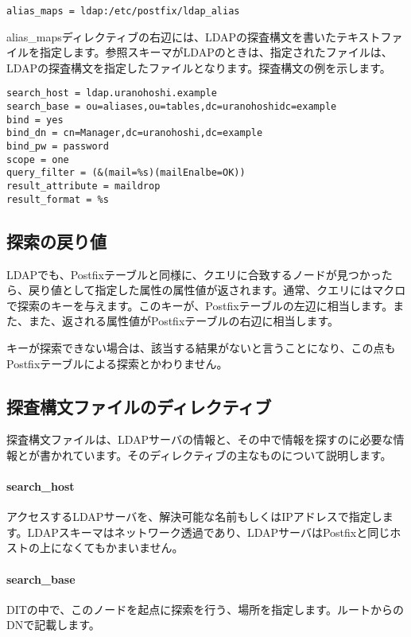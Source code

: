 \begin{verbatim}
alias_maps = ldap:/etc/postfix/ldap_alias
\end{verbatim}

alias\_mapsディレクティブの右辺には、LDAPの探査構文を書いたテキストファイルを指定します。参照スキーマがLDAPのときは、指定されたファイルは、LDAPの探査構文を指定したファイルとなります。探査構文の例を示します。

\begin{verbatim}
search_host = ldap.uranohoshi.example
search_base = ou=aliases,ou=tables,dc=uranohoshidc=example
bind = yes
bind_dn = cn=Manager,dc=uranohoshi,dc=example
bind_pw = password
scope = one
query_filter = (&(mail=%s)(mailEnalbe=OK))
result_attribute = maildrop
result_format = %s
\end{verbatim}

\subsection{探索の戻り値}

LDAPでも、Postfixテーブルと同様に、クエリに合致するノードが見つかったら、戻り値として指定した属性の属性値が返されます。通常、クエリにはマクロで探索のキーを与えます。このキーが、Postfixテーブルの左辺に相当します。また、また、返される属性値がPostfixテーブルの右辺に相当します。

キーが探索できない場合は、該当する結果がないと言うことになり、この点もPostfixテーブルによる探索とかわりません。


\subsection{探査構文ファイルのディレクティブ}

探査構文ファイルは、LDAPサーバの情報と、その中で情報を探すのに必要な情報とが書かれています。そのディレクティブの主なものについて説明します。

\paragraph{search\_host}
アクセスするLDAPサーバを、解決可能な名前もしくはIPアドレスで指定します。LDAPスキーマはネットワーク透過であり、LDAPサーバはPostfixと同じホストの上になくてもかまいません。

\paragraph{search\_base}
DITの中で、このノードを起点に探索を行う、場所を指定します。ルートからのDNで記載します。

